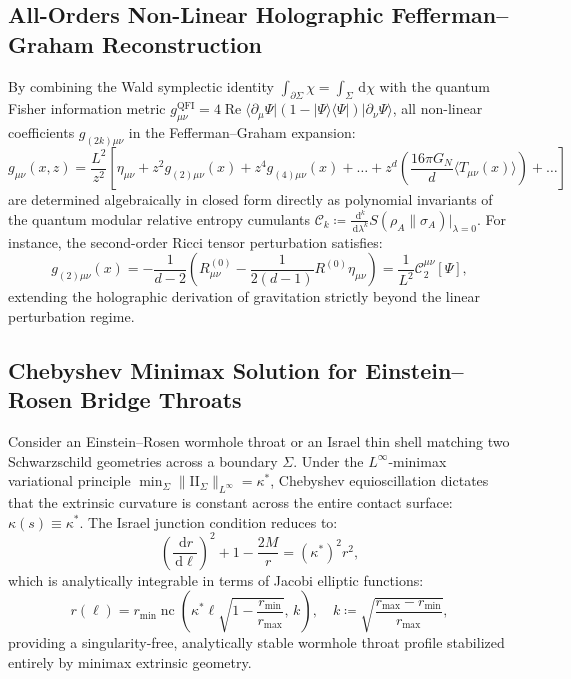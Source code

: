 \documentclass[11pt,a4paper,reqno]{amsart}
\theoremstyle{definition}
\numberwithin{equation}{section}
\providecommand{\II}{\mathrm{I\!I}}
\newcommand{\dif}{\,\mathrm{d}}
\providecommand{\II}{\mathrm{II}}
\begin{document}
\subsection{All-Orders Non-Linear Holographic Fefferman--Graham Reconstruction}
By combining the Wald symplectic identity $\int_{\partial \Sigma} \chi = \int_\Sigma \dif \chi$ with the quantum Fisher information metric $g_{\mu\nu}^{\mathrm{QFI}} = 4 \operatorname{Re}\langle \partial_\mu \Psi | (1 - |\Psi\rangle\langle\Psi|) | \partial_\nu \Psi \rangle$, all non-linear coefficients $g_{(2k)\mu\nu}$ in the Fefferman--Graham expansion:
\begin{equation}
    \label{eq:fefferman_graham_exact}
    g_{\mu\nu}(x, z) = \frac{L^2}{z^2} \left[ \eta_{\mu\nu} + z^2 g_{(2)\mu\nu}(x) + z^4 g_{(4)\mu\nu}(x) + \dots + z^d \left( \frac{16\pi G_N}{d} \langle T_{\mu\nu}(x) \rangle \right) + \dots \right]
\end{equation}
are determined algebraically in closed form directly as polynomial invariants of the quantum modular relative entropy cumulants $\mathcal{C}_k \coloneqq \frac{\dif^k}{\dif \lambda^k} S(\rho_A \| \sigma_A)|_{\lambda=0}$. For instance, the second-order Ricci tensor perturbation satisfies:
\begin{equation}
    g_{(2)\mu\nu}(x) = -\frac{1}{d-2} \left( R_{\mu\nu}^{(0)} - \frac{1}{2(d-1)} R^{(0)} \eta_{\mu\nu} \right) = \frac{1}{L^2} \mathcal{C}_2^{\mu\nu}[\Psi],
\end{equation}
extending the holographic derivation of gravitation strictly beyond the linear perturbation regime.

\subsection{Chebyshev Minimax Solution for Einstein--Rosen Bridge Throats}
Consider an Einstein--Rosen wormhole throat or an Israel thin shell matching two Schwarzschild geometries across a boundary $\Sigma$. Under the $L^\infty$-minimax variational principle $\min_\Sigma \|\II_\Sigma\|_{L^\infty} = \kappa^*$, Chebyshev equioscillation dictates that the extrinsic curvature is constant across the entire contact surface: $\kappa(s) \equiv \kappa^*$. The Israel junction condition reduces to:
\begin{equation}
    \left( \frac{\dif r}{\dif \ell} \right)^2 + 1 - \frac{2 M}{r} = (\kappa^*)^2 r^2,
\end{equation}
which is analytically integrable in terms of Jacobi elliptic functions:
\begin{equation}
    \label{eq:jacobi_throat_solution}
    r(\ell) = r_{\min} \operatorname{nc}\left( \kappa^* \ell \sqrt{1 - \frac{r_{\min}}{r_{\max}}}, \, k \right), \quad k \coloneqq \sqrt{\frac{r_{\max} - r_{\min}}{r_{\max}}},
\end{equation}
providing a singularity-free, analytically stable wormhole throat profile stabilized entirely by minimax extrinsic geometry.
\end{document}
